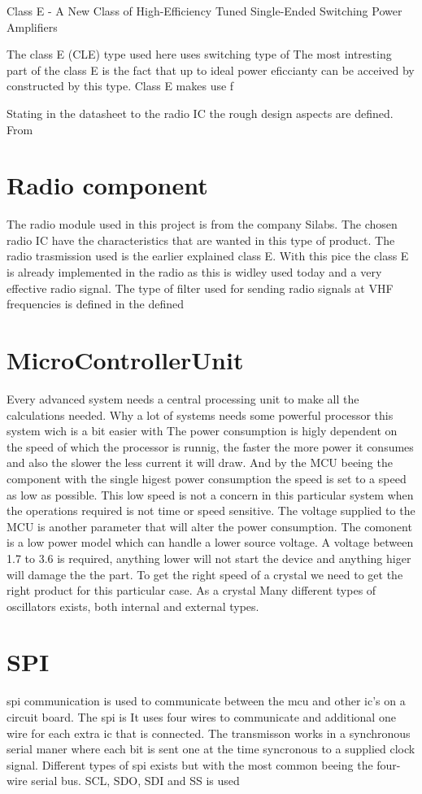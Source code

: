 \cite{class_e_new}
Class E - A New Class of High-Efficiency Tuned Single-Ended Switching Power Amplifiers

The class E (CLE) type used here uses switching type of 
The most intresting part of the class E is the fact that up to ideal power eficcianty can be acceived by constructed by this type. Class E makes use f

Stating in the datasheet to the radio IC the rough design aspects are defined. From

\section{Radio component}
 The radio module used in this project is from the company Silabs. The chosen radio IC have the characteristics that are wanted in this type of product. The radio trasmission used is the earlier explained class E. With this pice the class E is already implemented in the radio as this is widley used today and a very effective radio signal. 
The type of filter used for sending radio signals at VHF frequencies is defined in the defined 

\section{MicroControllerUnit}
Every advanced system needs a central processing unit to make all the calculations needed. Why a lot of systems needs some powerful processor this system wich is a bit easier with 
The power consumption is higly dependent on the speed of which the processor is runnig, the faster the more power it consumes and also the slower the less current it will draw. And by the MCU beeing the component with the single higest power consumption the speed is set to a speed as low as possible. This low speed is not a concern in this particular system when the operations required is not time or speed sensitive. The voltage supplied to the MCU is another parameter that will alter the power consumption. The comonent is a low power model which can handle a lower source voltage. A voltage between 1.7 to 3.6 is required, anything lower will not start the device and anything higer will damage the the part. 
To get the right speed of a crystal we need to get the right product for this particular case. As a crystal 
Many different types of oscillators exists, both internal and external types. 

\section{SPI}
\gls{spi} communication is used to communicate between the \gls{mcu} and other \gls{ic}'s on a circuit board. \cite{pic_spi} The \gls{spi} is 
It uses four wires to communicate and additional one wire for each extra \gls{ic} that is connected. The transmisson works in a synchronous serial maner where each bit is sent one at the time syncronous to a supplied clock signal. Different types of \gls{spi} exists but with the most common beeing the four-wire serial bus. SCL, SDO, SDI and SS is used 

